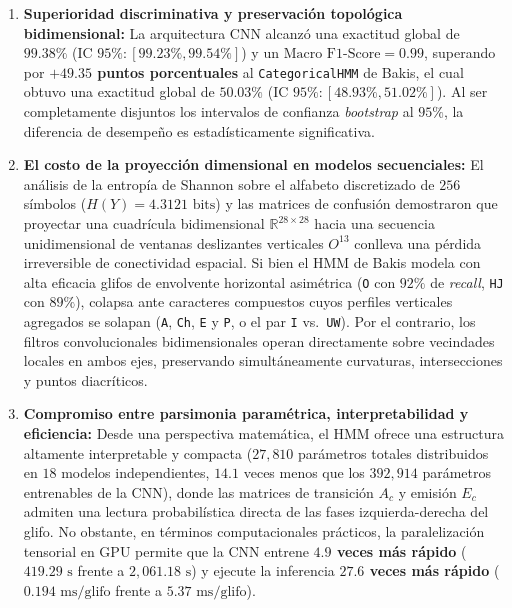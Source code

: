 \documentclass[
  spanish,
  us-letterpaper,
]{scrreprt}
\providecommand{\tightlist}{%
  \setlength{\itemsep}{0pt}\setlength{\parskip}{0pt}}
\theoremstyle{definition}
\theoremstyle{remark}
\begin{document}
\begin{enumerate}
\def\labelenumi{\arabic{enumi}.}
\tightlist
\item
  \textbf{Superioridad discriminativa y preservación topológica
  bidimensional:} La arquitectura CNN alcanzó una exactitud global de
  \textbf{\(99.38\%\)} (\(\text{IC } 95\%: [99.23\%, 99.54\%]\)) y un
  \(\text{Macro F1-Score} = 0.99\), superando por \textbf{\(+49.35\)
  puntos porcentuales} al \texttt{CategoricalHMM} de Bakis, el cual
  obtuvo una exactitud global de \textbf{\(50.03\%\)}
  (\(\text{IC } 95\%: [48.93\%, 51.02\%]\)). Al ser completamente
  disjuntos los intervalos de confianza \emph{bootstrap} al \(95\%\), la
  diferencia de desempeño es estadísticamente significativa.
\item
  \textbf{El costo de la proyección dimensional en modelos
  secuenciales:} El análisis de la entropía de Shannon sobre el alfabeto
  discretizado de \(256\) símbolos (\(H(Y) = 4.3121 \text{ bits}\)) y
  las matrices de confusión demostraron que proyectar una cuadrícula
  bidimensional \(\mathbb{R}^{28 \times 28}\) hacia una secuencia
  unidimensional de ventanas deslizantes verticales \(O^{13}\) conlleva
  una pérdida irreversible de conectividad espacial. Si bien el HMM de
  Bakis modela con alta eficacia glifos de envolvente horizontal
  asimétrica (\texttt{O} con \(92\%\) de \emph{recall}, \texttt{HJ} con
  \(89\%\)), colapsa ante caracteres compuestos cuyos perfiles
  verticales agregados se solapan (\texttt{A}, \texttt{Ch}, \texttt{E} y
  \texttt{P}, o el par \texttt{I} vs.~\texttt{UW}). Por el contrario,
  los filtros convolucionales bidimensionales operan directamente sobre
  vecindades locales en ambos ejes, preservando simultáneamente
  curvaturas, intersecciones y puntos diacríticos.
\item
  \textbf{Compromiso entre parsimonia paramétrica, interpretabilidad y
  eficiencia:} Desde una perspectiva matemática, el HMM ofrece una
  estructura altamente interpretable y compacta (\(27{,}810\) parámetros
  totales distribuidos en \(18\) modelos independientes, \(14.1\) veces
  menos que los \(392{,}914\) parámetros entrenables de la CNN), donde
  las matrices de transición \(A_c\) y emisión \(E_c\) admiten una
  lectura probabilística directa de las fases izquierda-derecha del
  glifo. No obstante, en términos computacionales prácticos, la
  paralelización tensorial en GPU permite que la CNN entrene
  \textbf{\(4.9\) veces más rápido} (\(419.29\text{ s}\) frente a
  \(2{,}061.18\text{ s}\)) y ejecute la inferencia \textbf{\(27.6\)
  veces más rápido} (\(0.194\text{ ms/glifo}\) frente a
  \(5.37\text{ ms/glifo}\)).
\end{enumerate}
\end{document}
